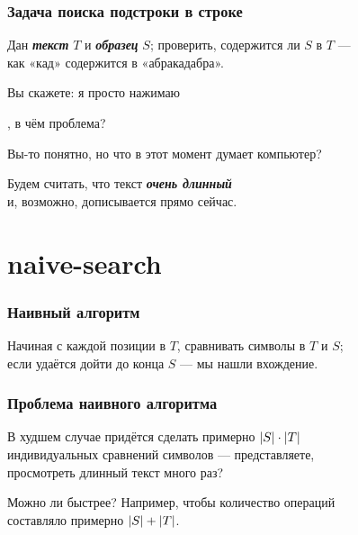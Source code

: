 \documentclass[11pt,aspectratio=169,svgnames]{beamer}
\DeclarePairedDelimiter{\len}{|}{|}
\begin{document}
\begin{frame} \frametitle{Задача поиска подстроки в строке}
	Дан {\itshape\bfseries текст} \(T\) и {\itshape\bfseries образец} \(S\); проверить,
	содержится ли \(S\) в \(T\) —\\
	как «кад» содержится в «абракадабра». \bigskip\bigskip \pause

	Вы скажете: я просто нажимаю\ \  , в чём проблема? \bigskip\bigskip \pause

	Вы-то понятно, но что в этот момент думает компьютер? \bigskip \pause

	Будем считать, что текст {\bfseries\itshape очень длинный} \\
	и, возможно, дописывается прямо сейчас.
\end{frame}


\section{naive-search}

\begin{frame} \frametitle{Наивный алгоритм}
Начиная с каждой позиции в \(T\), сравнивать символы в \(T\) и \(S\);\\
если удаётся дойти до конца \(S\) — мы нашли вхождение. \bigskip

\begin{center}  \end{center}
\end{frame}


\begin{frame} \frametitle{Проблема наивного алгоритма}
В худшем случае придётся сделать примерно \(\len*{S} \cdot \len*{T}\) \\
индивидуальных сравнений символов — представляете, \\
просмотреть длинный текст много раз? \bigskip \pause

Можно ли быстрее? Например, чтобы количество операций \\
составляло примерно \(\len*{S} + \len*{T}\).
\end{frame}
\end{document}

